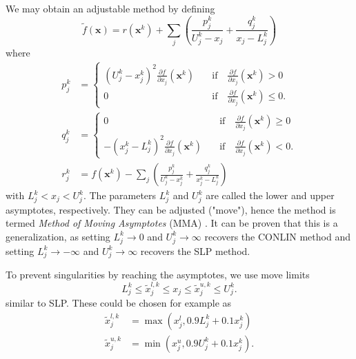 We may obtain an adjustable method by defining
\begin{equation}
    \tilde{f}(\mathbf{x}) = r(\mathbf{x}^k) + \sum_j \left( \frac{p_{j}^k}{U^k_j-x_j} + \frac{q_{j}^k}{x_j-L^k_j} \right) 
    \label{eq:mma_start}
\end{equation}
where
\begin{align}
    p_{j}^k &= 
    \begin{cases}
        (U^k_j-x^k_j)^2 \frac{\partial f}{\partial x_j} (\mathbf{x}^k)  &\quad \text{if} \quad \frac{\partial f}{\partial x_j} (\mathbf{x}^k) > 0 \\
        0 &\quad \text{if} \quad \frac{\partial f}{\partial x_j} (\mathbf{x}^k) \le 0.
    \end{cases} \\ 
    q_{j}^k &= 
    \begin{cases}
         0 &\quad \text{if} \quad \frac{\partial f}{\partial x_j} (\mathbf{x}^k) \ge 0 \\
        - (x^k_j-L^k_j)^2 \frac{\partial f}{\partial x_j} (\mathbf{x}^k) &\quad \text{if} \quad \frac{\partial f}{\partial x_j} (\mathbf{x}^k) < 0.
    \end{cases} \\ 
    r_j^k &= f(\mathbf{x}^k) - \sum_j \left(\frac{p_{j}^k}{U^k_j-x^k_j} + \frac{q_{j}^k}{x^k_j-L^k_j}  \right)
    \label{eq:mma_end}
\end{align}
with $L^k_j < x_j < U^k_j$. The parameters $L^k_j$ and $U_j^k$ are called the lower and upper asymptotes, respectively. They can be adjusted ("move"), hence the method is termed \emph{Method of Moving Asymptotes} (MMA) \cite{Svanberg1987}. It can be proven that this is a generalization, as setting $L^k_j \rightarrow 0$ and $U^k_j \rightarrow \infty$ recovers the CONLIN method and setting  $L^k_j \rightarrow -\infty$ and $U^k_j \rightarrow \infty$ recovers the SLP method.

To prevent singularities by reaching the asymptotes, we use move limits 
\begin{equation}
    L^k_j \le \tilde{x}_j^{l,k} \le x_j \le \tilde{x}_j^{u,k} \le U_j^k.
\end{equation}
similar to SLP. These could be chosen for example as 
\begin{align}
    \tilde{x}_j^{l,k} &= \max(x_j^l,  0.9 L_j^k + 0.1 x_j^k) \\
    \tilde{x}_j^{u,k} &= \min(x^u_j, 0.9 U_j^k + 0.1 x_j^k).
\end{align}

